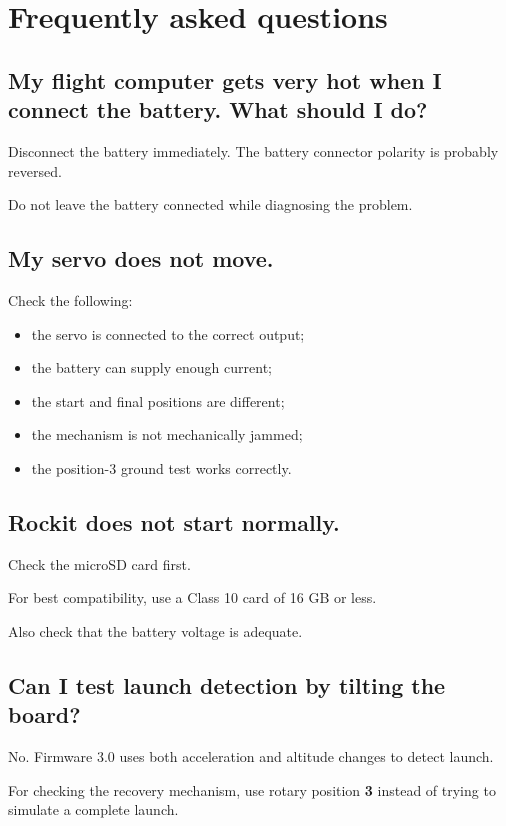 \documentclass[11pt,a4paper]{article}
\begin{document}
\section{Frequently asked questions}

\subsection*{My flight computer gets very hot when I connect the battery. What should I do?}

Disconnect the battery immediately. The battery connector polarity is probably reversed.

Do not leave the battery connected while diagnosing the problem.

\subsection*{My servo does not move.}

Check the following:

\begin{itemize}
    \item the servo is connected to the correct output;
    \item the battery can supply enough current;
    \item the start and final positions are different;
    \item the mechanism is not mechanically jammed;
    \item the position-3 ground test works correctly.
\end{itemize}

\subsection*{Rockit does not start normally.}

Check the microSD card first.

For best compatibility, use a Class 10 card of 16 GB or less.

Also check that the battery voltage is adequate.

\subsection*{Can I test launch detection by tilting the board?}

No. Firmware 3.0 uses both acceleration and altitude changes to detect launch.

For checking the recovery mechanism, use rotary position \textbf{3} instead of trying to simulate a complete launch.
\end{document}
